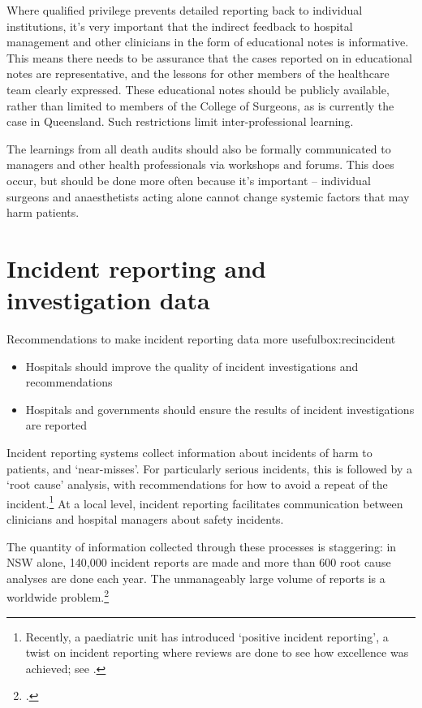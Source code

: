 \documentclass[FrontPage]{grattan}
\begin{document}
Where qualified privilege prevents detailed reporting back to individual institutions, it’s very important that the indirect feedback to hospital management and other clinicians in the form of educational notes is informative. This means there needs to be assurance that the cases reported on in educational notes are representative, and the lessons for other members of the healthcare team clearly expressed. These educational notes should be publicly available, rather than limited to members of the College of Surgeons, as is currently the case in Queensland. Such restrictions limit inter-professional learning.

The learnings from all death audits should also be formally communicated to managers and other health professionals via workshops and forums. This does occur, but should be done more often because it's important -- individual surgeons and anaesthetists acting alone cannot change systemic factors that may harm patients.

\section{Incident reporting and investigation data}\label{sec:incident}

\begin{addsmallbox}{Recommendations to make incident reporting data more useful}{box:recincident}
\begin{itemize}[leftmargin=*]
    \item Hospitals should improve the quality of incident investigations and recommendations
    \item Hospitals and governments should ensure the results of incident investigations are reported
\end{itemize}
\end{addsmallbox}

Incident reporting systems collect information about incidents of harm to patients, and ‘near-misses’. For particularly serious incidents, this is followed by a ‘root cause’ analysis, with recommendations for how to avoid a repeat of the incident.\footnote{Recently, a paediatric unit has introduced ‘positive incident reporting’, a twist on incident reporting where reviews are done to see how excellence was achieved; see \textcite{RN53}.}
At a local level, incident reporting facilitates communication between clinicians and hospital managers about safety incidents.

The quantity of information collected through these processes is staggering: in NSW alone, 140,000 incident reports are made and more than 600 root cause analyses are done each year. The unmanageably large volume of reports is a worldwide problem.\footcite{mitchell2016patient}
\end{document}
